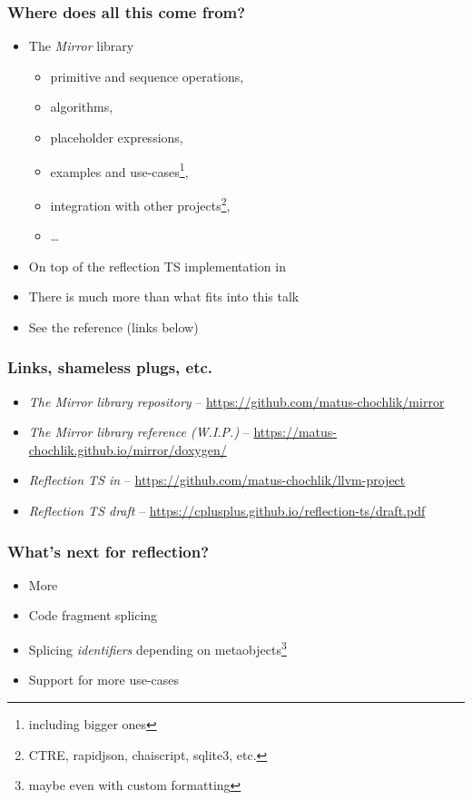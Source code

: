 \documentclass[compress,table,xcolor=table]{beamer}
\begin{document}
\begin{frame}
  \frametitle{Where does all this come from?}
  \larger
  \begin{itemize}
    \item The {\em Mirror} library
    \begin{itemize}
      \item primitive and sequence operations,
      \item algorithms,
      \item placeholder expressions,
      \item examples and use-cases\footnote{including bigger ones},
      \item integration with other projects\footnote{CTRE, rapidjson, chaiscript,
        sqlite3, etc.},
      \item \ldots
    \end{itemize}
    \item On top of the reflection TS implementation in 
    \item There is much more than what fits into this talk
    \item See the reference (links below)
  \end{itemize}
\end{frame}
\begin{frame}
  \frametitle{Links, shameless plugs, etc.}
  \smaller
  \begin{itemize}
    \item {\em The Mirror library repository} --
      \url{https://github.com/matus-chochlik/mirror}
    \item {\em The Mirror library reference (W.I.P.)} --
      \url{https://matus-chochlik.github.io/mirror/doxygen/}
    \item {\em Reflection TS in } --
      \url{https://github.com/matus-chochlik/llvm-project}
    \item {\em Reflection TS draft} --
      \url{https://cplusplus.github.io/reflection-ts/draft.pdf}
  \end{itemize}
\end{frame}
\begin{frame}
  \frametitle{What's next for reflection?}
  \Large
  \begin{itemize}
    \item More 
    \item Code fragment splicing
    \item Splicing {\em \larger identifiers} depending on metaobjects\footnote{
        maybe even with custom formatting}
    \item Support for more use-cases
  \end{itemize}
\end{frame}
\end{document}
